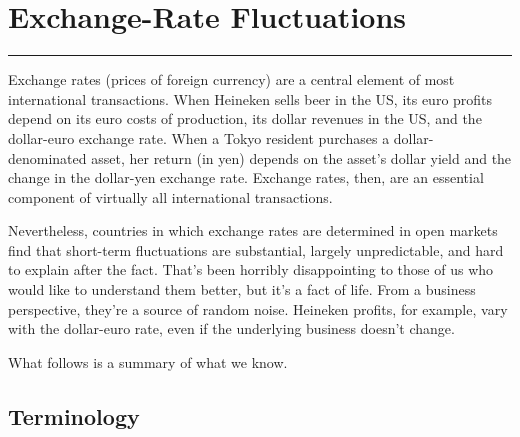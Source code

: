 \chapter{Exchange-Rate Fluctuations}\label{chp:fxf}
\hypertarget{fx}{}


\rule{\textwidth}{1pt}

Exchange rates
(prices of foreign currency)
are a central element of most international transactions.
When Heineken sells beer in the US, its euro profits depend on its euro costs of production,
its dollar revenues in the US, and the dollar-euro exchange rate.
When a Tokyo resident purchases a dollar-denominated asset,
her return (in yen) depends on the asset's dollar yield
and the change in the dollar-yen exchange rate.
Exchange rates, then, are an essential component  of virtually all
international transactions.

Nevertheless, countries in which exchange rates are determined
in open markets find that
short-term fluctuations are substantial, largely unpredictable,
and hard to explain after the fact.
That's been horribly disappointing to those of us who would like to
understand them better, but it's a fact of life.
From a business perspective, they're a source of random noise.
Heineken profits, for example, vary with the dollar-euro rate,
even if the underlying business doesn't change.

What follows is a summary of what we know.


\section{Terminology}

